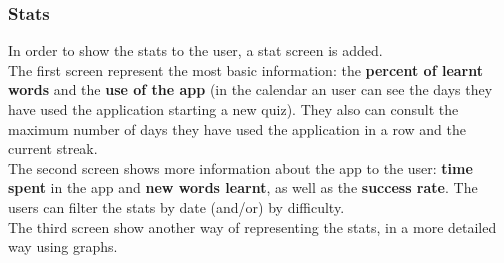 \subsubsection{Stats}
In order to show the stats to the user, a stat screen is added. \\

The first screen represent the most basic information: the \textbf{percent of learnt words} and the \textbf{use of the app} (in the calendar an user can see the days they have used the application starting a new quiz). They also can consult the maximum number of days they have used the application in a row and the current streak. \\

The second screen shows more information about the app to the user: \textbf{time spent} in the app and \textbf{new words learnt}, as well as the \textbf{success rate}. The users can filter the stats by date (and/or) by difficulty. \\

The third screen show another way of representing the stats, in a more detailed way using graphs. \\

